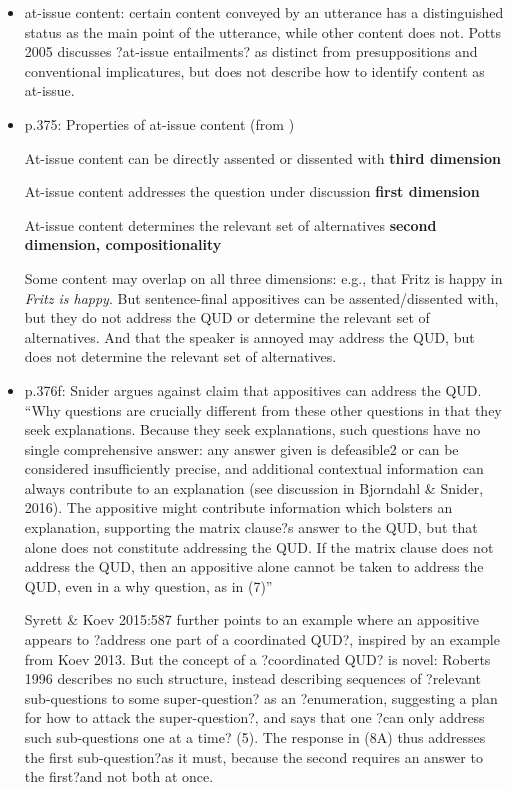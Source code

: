 \documentclass[11pt,fleqn]{article}
\newcommand{\6}{\mbox{$[\hspace*{-.6mm}[$}}
\newcommand{\9}{\mbox{$]\hspace*{-.6mm}]$}}
\begin{document}
\begin{itemize}
\begin{itemize}
\item at-issue content: certain content conveyed by an utterance has a distinguished status as the main point of the utterance, while other content does not. Potts 2005 discusses ?at-issue entailments? as distinct from presuppositions and conventional implicatures, but does not describe how to identify content as at-issue.

\item p.375: Properties of at-issue content (from \citealt{tonhauser-sula6})

At-issue content can be directly assented or dissented with {\bf third dimension}

At-issue content addresses the question under discussion {\bf first dimension}

At-issue content determines the relevant set of alternatives {\bf second dimension, compositionality}

Some content may overlap on all three dimensions: e.g., that Fritz is happy in {\em Fritz is happy}. But sentence-final appositives can be assented/dissented with, but they do not address the QUD or determine the relevant set of alternatives. And that the speaker is annoyed may address the QUD, but does not determine the relevant set of alternatives. 

\item p.376f: Snider argues against \citealt{syrett-koev2015} claim that appositives can address the QUD. ``Why questions are crucially different from these other questions in that they seek explanations. Because they seek explanations, such questions have no single comprehensive answer: any answer given is defeasible2 or can be considered insufficiently precise, and additional contextual information can always contribute to an explanation (see discussion in Bjorndahl \& Snider, 2016). The appositive might contribute information which bolsters an explanation, supporting the matrix clause?s answer to the QUD, but that alone does not constitute addressing the QUD. If the matrix clause does not address the QUD, then an appositive alone cannot be taken to address the QUD, even in a why question, as in (7)''

Syrett \& Koev 2015:587 further points to an example where an appositive appears to ?address one part of a coordinated QUD?, inspired by an example from Koev 2013. But the concept of a ?coordinated QUD? is novel: Roberts 1996 describes no such structure, instead describing sequences of ?relevant sub-questions to some super-question? as an ?enumeration, suggesting a plan for how to attack the super-question?, and says that one ?can only address such sub-questions one at a time? (5). The response in (8A) thus addresses the first sub-question?as it must, because the second requires an answer to the first?and not both at once. 


\end{itemize}
\end{itemize}
\end{document}

